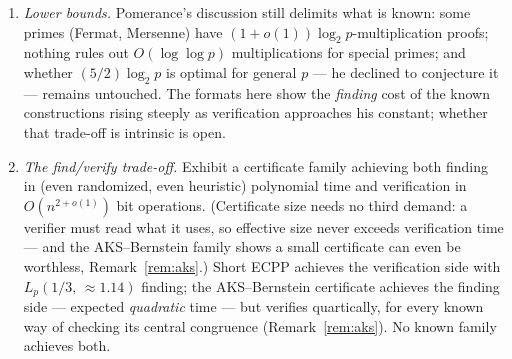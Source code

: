 \documentclass[11pt]{amsart}
\newcommand{\Lp}[2]{L_{p}\!\left(#1,\,#2\right)}
\theoremstyle{plain}
\theoremstyle{definition}
\theoremstyle{remark}
\begin{document}
\begin{enumerate}
derandomize a whole column of the table.
\item \emph{Lower bounds.}  Pomerance's discussion \cite[\S1]{Pom87} still delimits what is known: some
primes (Fermat, Mersenne) have $(1+o(1))\log_2 p$-multiplication proofs; nothing rules out
$O(\log\log p)$ multiplications for special primes; and whether $(5/2)\log_2 p$ is optimal for general
$p$ --- he declined to conjecture it --- remains untouched.  The formats here show the \emph{finding}
cost of the known constructions rising steeply as verification approaches his constant; whether that
trade-off is intrinsic is open.
\item \emph{The find/verify trade-off.}  Exhibit a certificate family achieving both finding in
(even randomized, even heuristic) polynomial time and verification in $O(n^{2+o(1)})$ bit operations.
(Certificate size needs no third demand: a verifier must read what it uses, so effective size never
exceeds verification time --- and the AKS--Bernstein family shows a small certificate can even be
worthless, Remark~\ref{rem:aks}.)  Short ECPP achieves the verification side with
$\Lp{1/3}{{\approx}1.14}$ finding; the AKS--Bernstein certificate achieves the finding side ---
expected \emph{quadratic} time --- but verifies quartically, for every known way of checking its
central congruence (Remark~\ref{rem:aks}).  No known family achieves both.
\end{enumerate}
\end{document}
